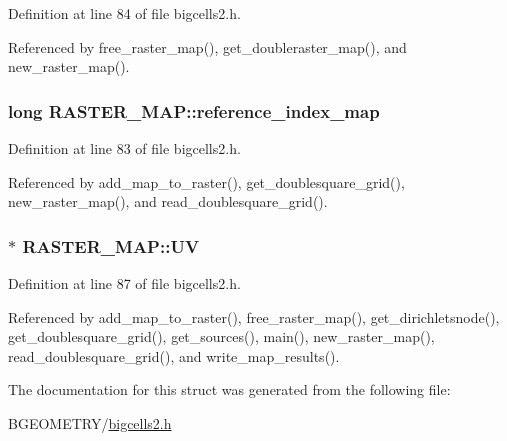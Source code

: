 Definition at line 84 of file bigcells2.\-h.



Referenced by free\-\_\-raster\-\_\-map(), get\-\_\-doubleraster\-\_\-map(), and new\-\_\-raster\-\_\-map().

\hypertarget{struct_r_a_s_t_e_r___m_a_p_a75505cbb814221d0b707b301d789dfba}{
\subsubsection[{reference\-\_\-index\-\_\-map}]{\setlength{\rightskip}{0pt plus 5cm}long R\-A\-S\-T\-E\-R\-\_\-\-M\-A\-P\-::reference\-\_\-index\-\_\-map}}\label{struct_r_a_s_t_e_r___m_a_p_a75505cbb814221d0b707b301d789dfba}


Definition at line 83 of file bigcells2.\-h.



Referenced by add\-\_\-map\-\_\-to\-\_\-raster(), get\-\_\-doublesquare\-\_\-grid(), new\-\_\-raster\-\_\-map(), and read\-\_\-doublesquare\-\_\-grid().

\hypertarget{struct_r_a_s_t_e_r___m_a_p_ad7a7d31ed31d1e4e3dc2bb49bc1fd646}{
\subsubsection[{U\-V}]{$\ast$ R\-A\-S\-T\-E\-R\-\_\-\-M\-A\-P\-::\-U\-V}}\label{struct_r_a_s_t_e_r___m_a_p_ad7a7d31ed31d1e4e3dc2bb49bc1fd646}


Definition at line 87 of file bigcells2.\-h.



Referenced by add\-\_\-map\-\_\-to\-\_\-raster(), free\-\_\-raster\-\_\-map(), get\-\_\-dirichletsnode(), get\-\_\-doublesquare\-\_\-grid(), get\-\_\-sources(), main(), new\-\_\-raster\-\_\-map(), read\-\_\-doublesquare\-\_\-grid(), and write\-\_\-map\-\_\-results().



The documentation for this struct was generated from the following file\-:\begin{DoxyCompactItemize}
\item 
B\-G\-E\-O\-M\-E\-T\-R\-Y/\hyperlink{bigcells2_8h}{bigcells2.\-h}\end{DoxyCompactItemize}
